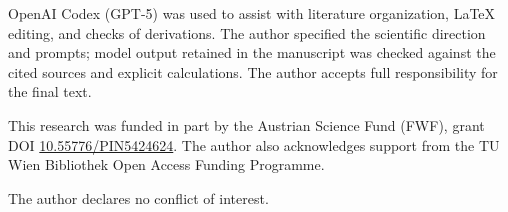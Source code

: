 \documentclass[
  aps,
  reprint,
  superscriptaddress,
  floatfix,
  nofootinbib,
  longbibliography
]{revtex4-2}
\begin{document}
\begin{acknowledgments}
OpenAI Codex (GPT-5) was used to assist with literature organization, \LaTeX{}
editing, and checks of derivations.  The author specified the scientific
direction and prompts; model output retained in the manuscript was checked
against the cited sources and explicit calculations.  The author accepts full
responsibility for the final text.

This research was funded in part by the Austrian Science Fund (FWF), grant DOI
\href{https://doi.org/10.55776/PIN5424624}{10.55776/PIN5424624}.
The author also acknowledges support from the TU Wien Bibliothek Open Access
Funding Programme.

The author declares no conflict of interest.
\end{acknowledgments}


\end{document}
